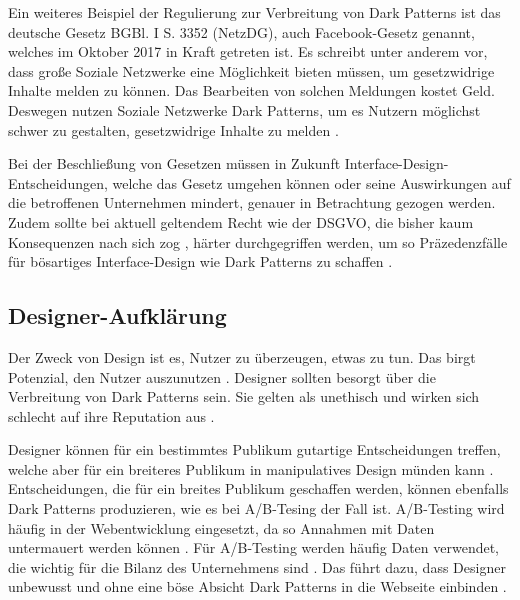 \documentclass[conference,compsoc,final,a4paper]{IEEEtran}
\begin{document}
Ein weiteres Beispiel der Regulierung zur Verbreitung von Dark Patterns ist das deutsche Gesetz BGBl. I S. 3352 (\ac{NetzDG}), auch Facebook-Gesetz genannt, welches im Oktober 2017 in Kraft getreten ist. Es schreibt unter anderem vor, dass große Soziale Netzwerke eine Möglichkeit bieten müssen, um gesetzwidrige Inhalte melden zu können. Das Bearbeiten von solchen Meldungen kostet Geld. Deswegen nutzen Soziale Netzwerke Dark Patterns, um es Nutzern möglichst schwer zu gestalten, gesetzwidrige Inhalte zu melden \autocite{Rieger2020}.


Bei der Beschließung von Gesetzen müssen in Zukunft Interface-Design-Entscheidungen, welche das Gesetz umgehen können oder seine Auswirkungen auf die betroffenen Unternehmen mindert, genauer in Betrachtung gezogen werden. Zudem sollte bei aktuell geltendem Recht wie der \ac{DSGVO}, die bisher kaum Konsequenzen nach sich zog \autocite{Nouwens2020}, härter durchgegriffen werden, um so Präzedenzfälle für bösartiges Interface-Design wie Dark Patterns zu schaffen \autocite{Rieger2020}.

\subsection{Designer-Aufklärung}
Der Zweck von Design ist es, Nutzer zu überzeugen, etwas zu tun. Das birgt Potenzial, den Nutzer auszunutzen \autocites{OinasKukkonen2009}{Sengers2005}. Designer sollten besorgt über die Verbreitung von Dark Patterns sein. Sie gelten als unethisch und wirken sich schlecht auf ihre Reputation aus \autocite{Narayanan2020}.

Designer können für ein bestimmtes Publikum gutartige Entscheidungen treffen, welche aber für ein breiteres Publikum in manipulatives Design münden kann \autocite{Gray_2018}. Entscheidungen, die für ein breites Publikum geschaffen werden, können ebenfalls Dark Patterns produzieren, wie es bei A/B-Tesing der Fall ist. A/B-Testing wird häufig in der Webentwicklung eingesetzt, da so Annahmen mit Daten untermauert werden können \autocite{Kohavi2017}. Für A/B-Testing werden häufig Daten verwendet, die wichtig für die Bilanz des Unternehmens sind \autocites{Kohavi2017}{Narayanan2020}. Das führt dazu, dass Designer unbewusst und ohne eine böse Absicht Dark Patterns in die Webseite einbinden \autocite{Narayanan2020}.
\end{document}
